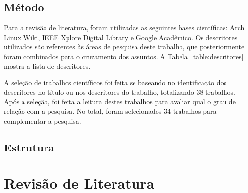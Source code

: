 \documentclass[
article,			%
12pt,				%
openright,			%
oneside,			%
a4paper,			%
chapter=TITLE,		%
section=TITLE,		%
subsection=TITLE,	%
subsubsection=TITLE,%
subsubsubsection=TITLE, %
english,			%
brazil,				%
]{abntex2}
\begin{document}
\subsection{Método}

Para a revisão de literatura, foram utilizadas as seguintes bases
científicas: Arch Linux Wiki, IEEE Xplore Digital Library e Google
Acadêmico. Os descritores utilizados são referentes às áreas de
pesquisa deste trabalho, que posteriormente foram combinados para o
cruzamento dos assuntos. A Tabela~\ref{table:descritores} mostra a
lista de descritores.

\begin{table}[H]
    \centering
    \caption{\label{table:descritores}Descritores utilizados}
\end{table}

A seleção de trabalhos científicos foi feita se baseando no
identificação dos descritores no título ou nos descritores do
trabalho, totalizando $38$ trabalhos.  Após a seleção, foi feita a
leitura destes trabalhos para avaliar qual o grau de relação com a
pesquisa. No total, foram selecionados $34$ trabalhos para
complementar a pesquisa.

\subsection{Estrutura}

\section{Revisão de Literatura}
\end{document}
